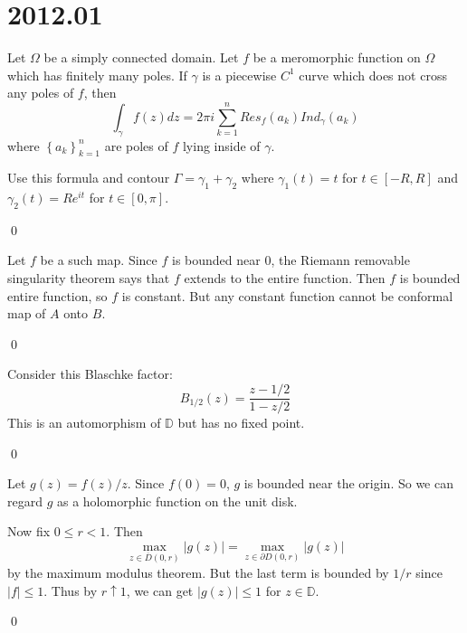 \section*{2012.01}

\begin{problem}
	
	Let $\Omega$ be a simply connected domain. Let $f$ be a meromorphic function on $\Omega$ which has finitely many poles.
	If $\gamma$ is a piecewise $C^1$ curve which does not cross any poles of $f$, then
	\[
		\int_\gamma f(z) dz = 2\pi i \sum_{k=1}^n Res_f(a_k) Ind_{\gamma}(a_k)
	\]
	where $\left\{ a_k \right\}_{k=1}^n$ are poles of $f$ lying inside of $\gamma$.

	Use this formula and contour $\Gamma = \gamma_1 + \gamma_2$ where $\gamma_1(t) = t$ for $t \in [-R, R]$ and $\gamma_2(t) = Re^{it}$ for $t \in [0, \pi]$.

	\qed
\end{problem}

\begin{problem}
	
	Let $f$ be a such map.
	Since $f$ is bounded near $0$, the Riemann removable singularity theorem says that $f$ extends to the entire function.
	Then $f$ is bounded entire function, so $f$ is constant.
	But any constant function cannot be conformal map of $A$ onto $B$.

	\qed
\end{problem}

\begin{problem}
	
	Consider this Blaschke factor:
	\[
		B_{1/2}(z) = \frac{z-1/2}{1-z/2}
	\]
	This is an automorphism of $\mathbb{D}$ but has no fixed point.

	\qed
\end{problem}

\begin{problem}
	
	Let $g(z) = f(z)/z$.
	Since $f(0) = 0$, $g$ is bounded near the origin.
	So we can regard $g$ as a holomorphic function on the unit disk.
	
	Now fix $0\leq r < 1$.
	Then
	\[
		\max_{z \in \overline{D}(0, r)} \lvert g(z) \lvert = \max_{z \in \partial D(0, r)}\lvert g(z) \lvert
	\]
	by the maximum modulus theorem.
	But the last term is bounded by $1/r$ since $|f| \leq 1$.
	Thus by $r \uparrow 1$, we can get $|g(z)| \leq 1$ for $z \in \mathbb{D}$.

	\qed
\end{problem}

